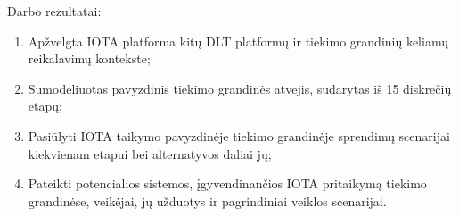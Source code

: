

Darbo rezultatai:
\begin{enumerate}
    \item Apžvelgta IOTA platforma kitų DLT platformų ir tiekimo grandinių keliamų reikalavimų kontekste;
    \item Sumodeliuotas pavyzdinis tiekimo grandinės atvejis, sudarytas iš 15 diskrečių etapų;
    \item Pasiūlyti IOTA taikymo pavyzdinėje tiekimo grandinėje sprendimų scenarijai kiekvienam etapui bei alternatyvos daliai jų;
    \item Pateikti potencialios sistemos, įgyvendinančios IOTA pritaikymą tiekimo grandinėse, veikėjai, jų užduotys ir pagrindiniai veiklos scenarijai.
\end{enumerate}